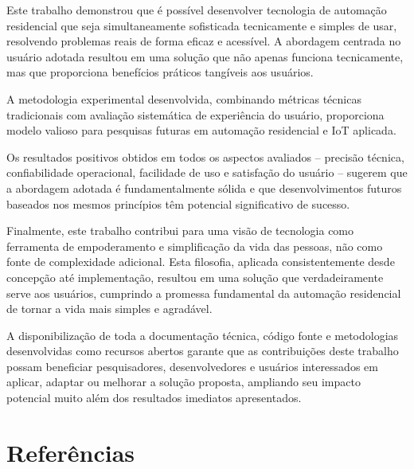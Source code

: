 Este trabalho demonstrou que é possível desenvolver tecnologia de automação residencial que seja simultaneamente sofisticada tecnicamente e simples de usar, resolvendo problemas reais de forma eficaz e acessível. A abordagem centrada no usuário adotada resultou em uma solução que não apenas funciona tecnicamente, mas que proporciona benefícios práticos tangíveis aos usuários.

A metodologia experimental desenvolvida, combinando métricas técnicas tradicionais com avaliação sistemática de experiência do usuário, proporciona modelo valioso para pesquisas futuras em automação residencial e IoT aplicada.

Os resultados positivos obtidos em todos os aspectos avaliados – precisão técnica, confiabilidade operacional, facilidade de uso e satisfação do usuário – sugerem que a abordagem adotada é fundamentalmente sólida e que desenvolvimentos futuros baseados nos mesmos princípios têm potencial significativo de sucesso.

Finalmente, este trabalho contribui para uma visão de tecnologia como ferramenta de empoderamento e simplificação da vida das pessoas, não como fonte de complexidade adicional. Esta filosofia, aplicada consistentemente desde concepção até implementação, resultou em uma solução que verdadeiramente serve aos usuários, cumprindo a promessa fundamental da automação residencial de tornar a vida mais simples e agradável.

A disponibilização de toda a documentação técnica, código fonte e metodologias desenvolvidas como recursos abertos garante que as contribuições deste trabalho possam beneficiar pesquisadores, desenvolvedores e usuários interessados em aplicar, adaptar ou melhorar a solução proposta, ampliando seu impacto potencial muito além dos resultados imediatos apresentados.

\chapter{Referências}

